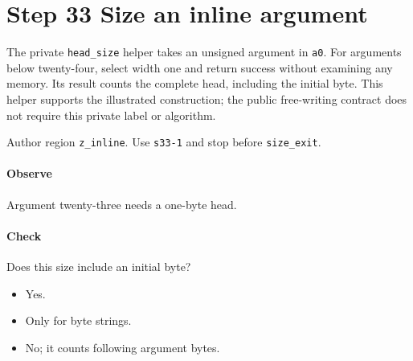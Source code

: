 \section{Step 33 Size an inline argument}\label{cbor-s33}
The private \texttt{head\_size} helper takes an unsigned argument in \texttt{a0}. For arguments below twenty-four, select width one and return success without examining any memory. Its result counts the complete head, including the initial byte. This helper supports the illustrated construction; the public free-writing contract does not require this private label or algorithm.

Author region \texttt{z\_inline}. Use \texttt{s33-1} and stop before \texttt{size\_exit}.

\paragraph{Observe} Argument twenty-three needs a one-byte head.

\paragraph{Check} Does this size include an initial byte?
\begin{itemize}
  \item[A.] Yes.
  \item[B.] Only for byte strings.
  \item[C.] No; it counts following argument bytes.
\end{itemize}
